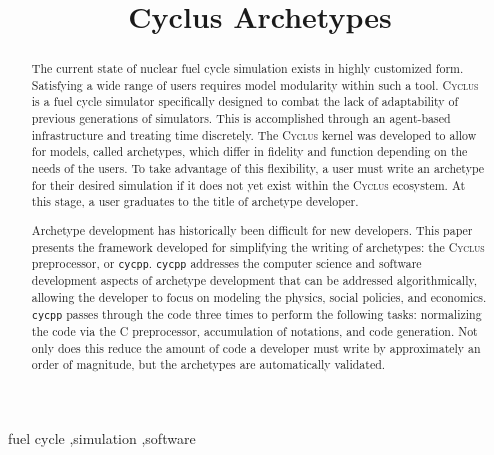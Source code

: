 \documentclass[review]{elsarticle}
\date{}
\newcommand{\code}[1]{\lstinline[basicstyle=\ttfamily\color{green!40!black}]|#1|}
\newcommand{\cyclus}{\textsc{Cyclus}\xspace}
\newcommand{\Cyclus}{\cyclus}
\newcommand{\cycpp}{\code{cycpp}\xspace}
\begin{document}
\begin{frontmatter}
\title{Cyclus Archetypes}







\begin{abstract}
The current state of nuclear fuel cycle simulation exists in highly 
customized form. Satisfying a wide range of users requires model modularity 
within such a tool. \Cyclus is a fuel cycle simulator specifically designed to 
combat the lack of adaptability of previous generations of simulators. This is
accomplished through an agent-based infrastructure and treating time 
discretely. The \Cyclus kernel was developed to allow for models, called 
archetypes, which differ in fidelity and function depending on the needs of the users. 
To take advantage of this flexibility, a user must write an archetype for 
their desired simulation if it does not yet exist within the \Cyclus ecosystem.
At this stage, a user graduates to the title of archetype developer.

Archetype development has historically been difficult for new developers.
This paper presents the framework developed for simplifying the writing of 
archetypes: the \Cyclus preprocessor, or \cycpp. \cycpp addresses the computer 
science and software development aspects of archetype development
that can be addressed algorithmically, allowing the developer to focus on 
modeling the physics, social policies, and economics. \cycpp passes through 
the code three times to perform the following tasks: normalizing the code via 
the C preprocessor, accumulation of notations, and code generation. Not only
does this reduce the amount of code a developer must write by approximately 
an order of magnitude, but the archetypes are automatically validated.
\end{abstract}

\begin{keyword}
fuel cycle \sep simulation \sep software
\end{keyword}

\end{frontmatter}











\end{document}
